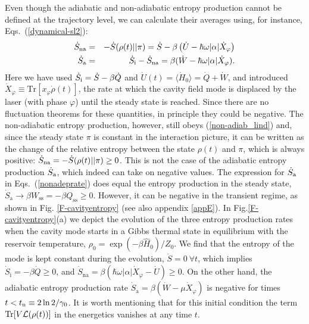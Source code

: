 \documentclass[aps,prx,twocolumn,showpacs,floatfix,superscriptaddress,graphics,longbibliography]{revtex4-1}
\newcommand{\tr}{\mathrm{Tr}}
\begin{document}
Even though the adiabatic and non-adiabatic entropy production cannot be defined at the trajectory level, we can calculate their averages   \cite{Spohn} using, for instance, Eqs.~(\ref{dynamical-sl2}):
\begin{eqnarray}\label{nonadeprate}
 \dot{S}_{\rm na} &= &-\dot S(\rho(t)||\pi)= \dot{S} - \beta \left( \dot{U} - \hbar\omega|\alpha| \dot{X}_{\varphi} \right)   \\
 \dot{S}_{\rm a} &=& \dot{S}_{\rm i} - \dot{S}_{\rm na} = \beta(\dot{W} - \hbar\omega|\alpha| \dot{X}_\mathcal{\varphi}).
\end{eqnarray}
Here we have used $\dot{S}_{\rm i}=\dot S-\beta\dot Q$ and $\dot U(t)=\langle \dot H_0\rangle =\dot Q+\dot W$, and introduced $\dot{X}_{\varphi} \equiv \tr[x_{\varphi} \dot{\rho}(t)]$, the rate at which the cavity field mode is displaced by the laser (with phase $\varphi$) until the 
steady state is reached. 
Since there are no fluctuation theorems for these quantities, in principle they could be negative. The non-adiabatic entropy production, however, still obeys (\ref{non-adiab_lind}) and, since the steady state $\pi$ is constant in the interaction picture, it can be written as the change 
of the relative entropy between the state $\rho(t)$ and $\pi$, which is always positive: $\dot S_{\rm na}=-\dot S(\rho(t)||\pi)\geq 0$. This is not the case of the adiabatic entropy production $\dot S_{\rm a}$, which indeed can take on negative values. The expression for $\dot S_{\rm a}$ 
in Eqs.~(\ref{nonadeprate}) does equal the entropy production in the steady state, $\dot{S}_\mathrm{a} \rightarrow \beta W_\mathrm{ss}=- \beta Q_\mathrm{ss} \geq 0$. However, it can be negative in the transient regime, as  shown in Fig. \ref{F-cavityentropy} (see also appendix \ref{appE}). 
In Fig.\ref{F-cavityentropy}(a) we depict the evolution of the three entropy production rates when the cavity mode starts in a Gibbs thermal state in equilibrium with the reservoir temperature, $\rho_0 = \exp(-\beta \hat{H}_0)/Z_0$. We find that the entropy of the mode is kept constant during 
the evolution, $\dot{S} = 0~ \forall t$, which implies $\dot{S}_{\mathrm i}= - \beta \dot{Q} \geq 0$, and $\dot{S}_{\mathrm{na}} = \beta(\hbar\omega|\alpha| \dot{X}_{\varphi} - \dot{U}) \geq 0$. On the other hand, the adiabatic entropy production rate $\dot{S}_{\mathrm a} = \beta(\dot{W} - \mu \dot{X}_{\varphi})$ 
is negative for times $t<t_{\rm n}\equiv 2\ln2 /\gamma_0$. It is worth mentioning that for this initial condition the term $\tr[V{\cal L}(\rho(t))]$  in the energetics vanishes at any time $t$.
\end{document}
